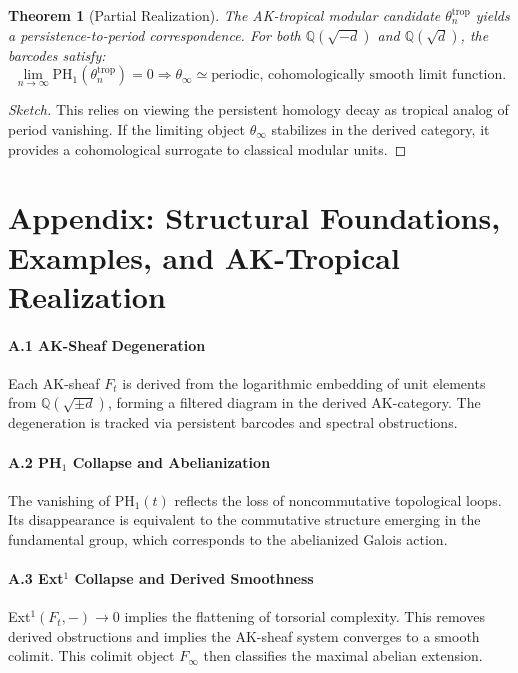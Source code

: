 \documentclass[11pt]{article}
\newtheorem{theorem}{Theorem}[section]
\begin{document}
\begin{theorem}[Partial Realization]
The AK-tropical modular candidate $\theta_n^{\text{trop}}$ yields a persistence-to-period correspondence. For both $\mathbb{Q}(\sqrt{-d})$ and $\mathbb{Q}(\sqrt{d})$, the barcodes satisfy:
\[
\lim_{n \to \infty} \mathrm{PH}_1(\theta_n^{\text{trop}}) = 0 \Rightarrow \theta_\infty \simeq \text{periodic, cohomologically smooth limit function}.
\]
\end{theorem}

\begin{proof}[Sketch]
This relies on viewing the persistent homology decay as tropical analog of period vanishing. If the limiting object $\theta_\infty$ stabilizes in the derived category, it provides a cohomological surrogate to classical modular units.
\end{proof}

\appendix
\section*{Appendix: Structural Foundations, Examples, and AK-Tropical Realization}

\paragraph{A.1 AK-Sheaf Degeneration}
Each AK-sheaf $F_t$ is derived from the logarithmic embedding of unit elements from $\mathbb{Q}(\sqrt{\pm d})$, forming a filtered diagram in the derived AK-category. The degeneration is tracked via persistent barcodes and spectral obstructions.

\paragraph{A.2 PH$_1$ Collapse and Abelianization}
The vanishing of $\mathrm{PH}_1(t)$ reflects the loss of noncommutative topological loops. Its disappearance is equivalent to the commutative structure emerging in the fundamental group, which corresponds to the abelianized Galois action.

\paragraph{A.3 Ext$^1$ Collapse and Derived Smoothness}
Ext$^1(F_t, -) \to 0$ implies the flattening of torsorial complexity. This removes derived obstructions and implies the AK-sheaf system converges to a smooth colimit. This colimit object $F_\infty$ then classifies the maximal abelian extension.
\end{document}
